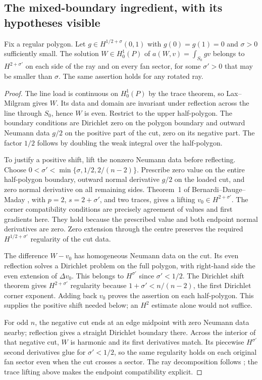 \subsection{The mixed-boundary ingredient, with its hypotheses visible}
\begin{lemma}
\label{l2:raylemma}
Fix a regular polygon. Let $g\in H^{1/2+\sigma}(0,1)$ with $g(0)=g(1)=0$
and $\sigma>0$ sufficiently small. The solution $W\in H^1_0(P)$ of
$a(W,v)=\int_{S_0}gv$ belongs to $H^{2+\sigma'}$ on each side of the ray
and on every fan sector, for some $\sigma'>0$ that may be smaller than
$\sigma$. The same assertion holds for any rotated ray.
\end{lemma}
\begin{proof}
The line load is continuous on $H^1_0(P)$ by the trace theorem, so
Lax--Milgram gives $W$. Its data and domain are invariant under reflection
across the line through $S_0$, hence $W$ is even. Restrict to the upper
half-polygon. The boundary conditions are Dirichlet zero on the polygon
boundary and outward Neumann data $g/2$ on the positive part of the cut,
zero on its negative part. The factor $1/2$ follows by doubling the weak
integral over the half-polygon.

To justify a positive shift, lift the nonzero Neumann data before
reflecting. Choose $0<\sigma'<\min\{\sigma,1/2,2/(n-2)\}$.
Prescribe zero value on the entire half-polygon boundary, outward normal
derivative $g/2$ on the loaded cut, and zero normal derivative on all
remaining sides. Theorem~1 of Bernardi--Dauge--Maday
\cite{BernardiDaugeMaday2000}, with $p=2$, $s=2+\sigma'$, and two traces,
gives a lifting $v_0\in H^{2+\sigma'}$. The corner compatibility conditions
are precisely agreement of values and first gradients here. They hold
because the prescribed value and both endpoint normal derivatives are
zero. Zero extension through the centre preserves the required
$H^{1/2+\sigma'}$ regularity of the cut data.

The difference $W-v_0$ has homogeneous Neumann data on the cut.
Its even reflection solves a Dirichlet problem on the full polygon,
with right-hand side the even extension of $\Delta v_0$.
This belongs to $H^{\sigma'}$ since $\sigma'<1/2$.
The Dirichlet shift theorem \cite[Chapter~4]{Grisvard1985} gives
$H^{2+\sigma'}$ regularity because $1+\sigma'<n/(n-2)$, the first
Dirichlet corner exponent. Adding back $v_0$ proves the assertion on
each half-polygon. This supplies the positive shift needed below;
an $H^2$ estimate alone would not suffice.

For odd $n$, the negative cut ends at an edge midpoint with zero Neumann
data nearby; reflection gives a straight Dirichlet boundary there.
Across the interior of that negative cut, $W$ is harmonic and its first
derivatives match. Its piecewise $H^{\sigma'}$ second derivatives glue
for $\sigma'<1/2$, so the same regularity holds on each original fan
sector even when the cut crosses a sector. The ray decomposition follows
\cite[Section~3]{BogoselBucurValidated2024}; the trace lifting above makes
the endpoint compatibility explicit.
\end{proof}

